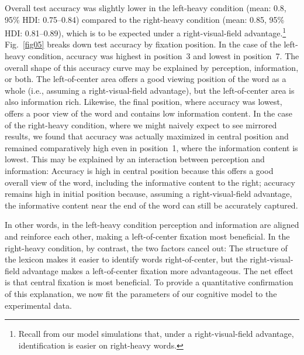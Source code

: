 \documentclass[doc,biblatex]{apa7}
\begin{document}
Overall test accuracy was slightly lower in the left-heavy condition (mean: 0.8, 95\% HDI: 0.75--0.84) compared to the right-heavy condition (mean: 0.85, 95\% HDI: 0.81--0.89), which is to be expected under a right-visual-field advantage.\footnote{Recall from our model simulations that, under a right-visual-field advantage, identification is easier on right-heavy words.} Fig.~\ref{fig05} breaks down test accuracy by fixation position. In the case of the left-heavy condition, accuracy was highest in position~3 and lowest in position~7. The overall shape of this accuracy curve may be explained by perception, information, or both. The left-of-center area offers a good viewing position of the word as a whole (i.e., assuming a right-visual-field advantage), but the left-of-center area is also information rich. Likewise, the final position, where accuracy was lowest, offers a poor view of the word and contains low information content. In the case of the right-heavy condition, where we might naively expect to see mirrored results, we found that accuracy was actually maximized in central position and remained comparatively high even in position~1, where the information content is lowest. This may be explained by an interaction between perception and information: Accuracy is high in central position because this offers a good overall view of the word, including the informative content to the right; accuracy remains high in initial position because, assuming a right-visual-field advantage, the informative content near the end of the word can still be accurately captured.

In other words, in the left-heavy condition perception and information are aligned and reinforce each other, making a left-of-center fixation most beneficial. In the right-heavy condition, by contrast, the two factors cancel out: The structure of the lexicon makes it easier to identify words right-of-center, but the right-visual-field advantage makes a left-of-center fixation more advantageous. The net effect is that central fixation is most beneficial. To provide a quantitative confirmation of this explanation, we now fit the parameters of our cognitive model to the experimental data.
\end{document}
